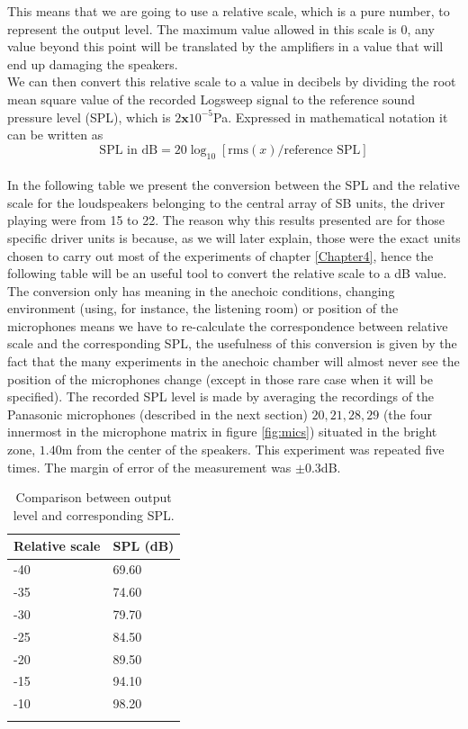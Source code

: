 This means that we are going to use a relative scale, which is a pure number, to represent the output level. The maximum value allowed in this scale is $0$, any value beyond this point will be translated by the amplifiers in a value that will end up damaging the speakers.
\\
We can then convert this relative scale to a value in decibels by dividing the root mean square value of the recorded Logsweep signal to the reference sound pressure level (SPL), which is $2\textbf{x}10^{-5}$Pa. Expressed in mathematical notation it can be written as
\[\text{SPL in dB}= 20 \log_{10} \left[\text{rms}(x)/ \text{reference SPL} \right]\]
\\
In the following table we present the conversion between the SPL and the relative scale for the loudspeakers belonging to the central array of SB units, the driver playing were from 15 to 22. The reason why this results presented are for those specific driver units is because, as we will later explain, those were the exact units chosen to carry out most of the experiments of chapter \ref{Chapter4}, hence the following table will be an useful tool to convert the relative scale to a dB value. The conversion only has meaning in the anechoic conditions, changing environment (using, for instance, the listening room) or position of the microphones means we have to re-calculate the correspondence between relative scale and the corresponding SPL, the usefulness of this conversion is given by the fact that the many experiments in the anechoic chamber will almost never see the position of the microphones change (except in those rare case when it will be specified). The recorded SPL level is made by averaging the recordings of the Panasonic microphones (described in the next section) $20, 21, 28, 29$ (the four innermost in the microphone matrix in figure \ref{fig:mics}) situated in the bright zone, $1.40$m from the center of the speakers. This experiment was repeated five times. The margin of error of the measurement was $\pm 0.3$dB.

\begin{table}[H]
\label{tab:relativescale}
\centering
\begin{tabular}{ll}
\toprule
Relative scale & SPL (dB)\\
\midrule
-40            & 69.60\\
-35            & 74.60\\
-30            & 79.70\\
-25            & 84.50\\
-20            & 89.50\\
-15            & 94.10\\
-10            & 98.20\\
\bottomrule\\
\end{tabular}
\caption{Comparison between output level and corresponding SPL.}
\label{tab:relativescale}
\end{table}

